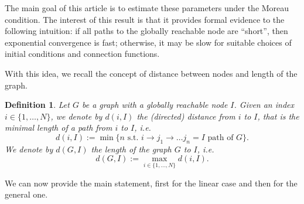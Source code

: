 \documentclass[journal]{article}
\newtheorem{definition}[lemma]{Definition}
\begin{document}
The main goal of this article is to estimate these parameters under the Moreau condition. The interest of this result is that it provides formal evidence to the following intuition: if all paths to the globally reachable node are ``short'', then exponential convergence is fast; otherwise, it may be slow for suitable choices of initial conditions and connection functions.

With this idea, we recall the concept of distance between nodes and length of the graph.
\begin{definition} Let $G$ be a graph with a globally reachable node $I$. Given an index $i\in \{1,\ldots,N\}$, we denote by $d(i,I)$ the (directed) distance from $i$ to $I$, that is the minimal length of a path from $i$ to $I$, i.e.
\begin{equation}
\label{e-distance}
d(i,I):= \min \Big\{ n\mbox{~s.t.~} i\to j_1\to \ldots j_n=I\mbox{~path of~}G\Big\}.
\end{equation}
We denote by $d(G,I)$ the length of the graph $G$ to $I$, i.e. 
\begin{equation}\label{e-length}
d(G,I):=\max_{i\in\{1,\ldots,N\}} d(i,I).
\end{equation}
\end{definition}
We can now provide the main statement, first for the linear case and then for the general one.
\end{document}
